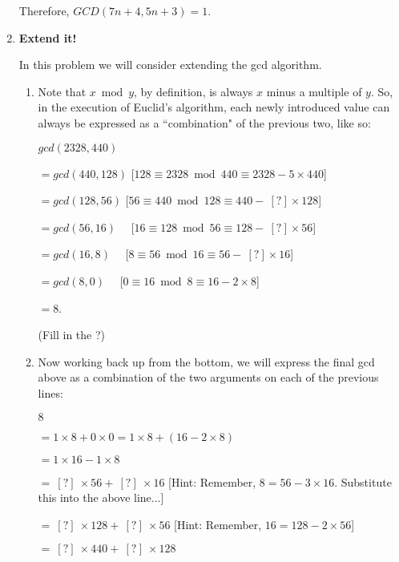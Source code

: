 \documentclass[11pt]{article}
\newif\ifsolutions
\begin{document}
\begin{enumerate}
Therefore, $GCD(7n+4,5n+3)=1$.
\fi

\vspace{30mm}

\item {\bf Extend it!}

In this problem we will consider extending the gcd algorithm.

\begin{enumerate}

\item Note that $x \bmod y$, by definition, is always $x$ minus a multiple of $y$. So, in the execution of Euclid's algorithm, each newly introduced value can always be expressed as a ``combination" of the previous two, like so:

$ gcd(2328, 440)$ 

$= gcd(440, 128)$ [$128 \equiv 2328 \bmod{440} \equiv 2328 - 5 \times 440$] 

$= gcd(128, 56)$   [$56 \equiv 440 \bmod {128} \equiv 440 - \ [?] \times 128$]  \ifsolutions  {\bf solution}:  $[?] = 3$ \fi

$= gcd(56, 16)$ \ \  [$16 \equiv 128 \bmod{56} \equiv 128 - \ [?] \times 56$]   \ifsolutions  {\bf solution}:  $[?] = 2$ \fi

$= gcd(16, 8)$  \ \ [$8 \equiv 56 \bmod{16} \equiv 56 - \ [?] \times 16$] \ifsolutions {\bf solution}: $[?] = 3$ \fi

$= gcd(8, 0)$  \ \ [$0 \equiv 16 \bmod{8} \equiv 16 - 2 \times 8$]

$= 8$.

(Fill in the ?)


\item Now working back up from the bottom, we will express the final gcd above as a combination of the two arguments on each of the previous lines:

$8$

$= 1 \times 8 + 0 \times 0 = 1 \times 8 + (16 - 2 \times 8)$

$= 1 \times 16 - 1 \times 8$ 

$= \ [?] \ \times 56 + \ [?] \ \times 16$ [Hint: Remember, $8 = 56 - 3 \times 16$. Substitute this into the above line...] \ifsolutions{$1 \times 16 - 1 \times (56 - 3 \times 16) = -1 \times 56 + 4 \times 16$} \fi

$= \ [?] \ \times 128 + \ [?] \ \times 56$ [Hint: Remember, $16 = 128 - 2 \times 56$] \ifsolutions{$4 \times 128 - 9 \times 56$} \fi

$= \ [?] \ \times 440 + \ [?] \ \times 128$ \ifsolutions{$-9 \times 440 + 31 \times 128$} \fi


\end{enumerate}
\end{enumerate}
\end{document}
